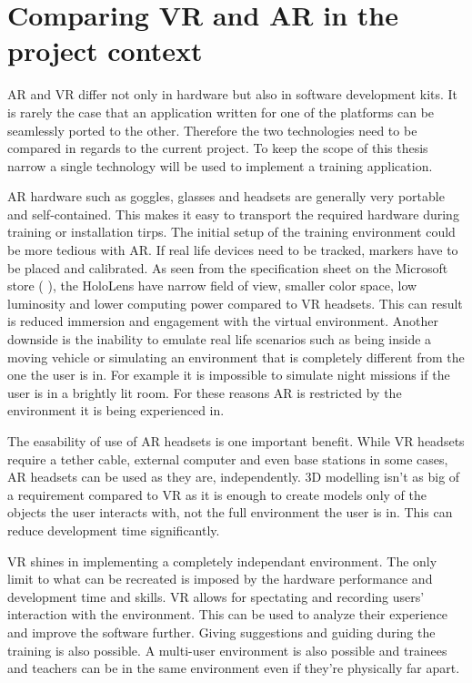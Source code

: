 \documentclass[12pt, a4paper,oneside, nocenter]{thesis}
\newcommand{\citeyeartitlexamkinline}[1]{(\usebibentry{#1}{title} \citeyear{#1})}
\begin{document}
\section{Comparing VR and AR in the project context}
AR and VR differ not only in hardware but also in software development kits. It is rarely the case that an application written for one of the platforms can be seamlessly ported to the other. Therefore the two technologies need to be compared in regards to the current project. To keep the scope of this thesis narrow a single technology will be used to implement a training application.
\par
AR hardware such as goggles, glasses and headsets are generally very portable and self-contained. This makes it easy to transport the required hardware during training or installation tirps. The initial setup of the training environment could be more tedious with AR. If real life devices need to be tracked, markers have to be placed and calibrated. As seen from the specification sheet on the Microsoft store \citeyeartitlexamkinline{hololens-specs}, the HoloLens have narrow field of view, smaller color space, low luminosity and lower computing power compared to VR headsets. This can result is reduced immersion and engagement with the virtual environment. Another downside is the inability to emulate real life scenarios such as being inside a moving vehicle or simulating an environment that is completely different from the one the user is in. For example it is impossible to simulate night missions if the user is in a brightly lit room. For these reasons AR is restricted by the environment it is being experienced in.
\par
The easability of use of AR headsets is one important benefit. While VR headsets require a tether cable, external computer and even base stations in some cases, AR headsets can be used as they are, independently. 3D modelling isn't as big of a requirement compared to VR as it is enough to create models only of the objects the user interacts with, not the full environment the user is in. This can reduce development time significantly.
\par
VR shines in implementing a completely independant environment. The only limit to what can be recreated is imposed by the hardware performance and development time and skills. VR allows for spectating and recording users' interaction with the environment. This can be used to analyze their experience and improve the software further. Giving suggestions and guiding during the training is also possible. A multi-user environment is also possible and trainees and teachers can be in the same environment even if they're physically far apart.
\end{document}
